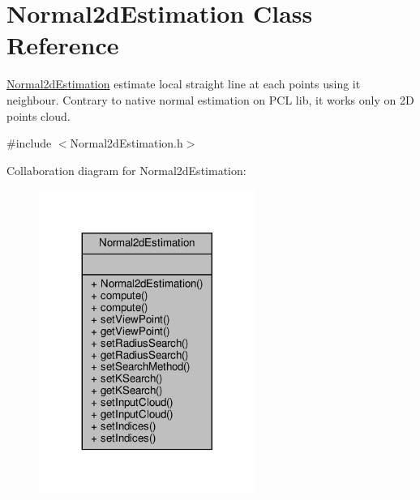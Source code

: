 \hypertarget{classNormal2dEstimation}{}\section{Normal2d\+Estimation Class Reference}
\label{classNormal2dEstimation}


\hyperlink{classNormal2dEstimation}{Normal2d\+Estimation} estimate local straight line at each points using it neighbour. Contrary to native normal estimation on P\+CL lib, it works only on 2D points cloud.  




{\ttfamily \#include $<$Normal2d\+Estimation.\+h$>$}



Collaboration diagram for Normal2d\+Estimation\+:\nopagebreak
\begin{figure}[H]
\begin{center}
\leavevmode
\includegraphics[width=200pt]{da/def/classNormal2dEstimation__coll__graph}
\end{center}
\end{figure}
